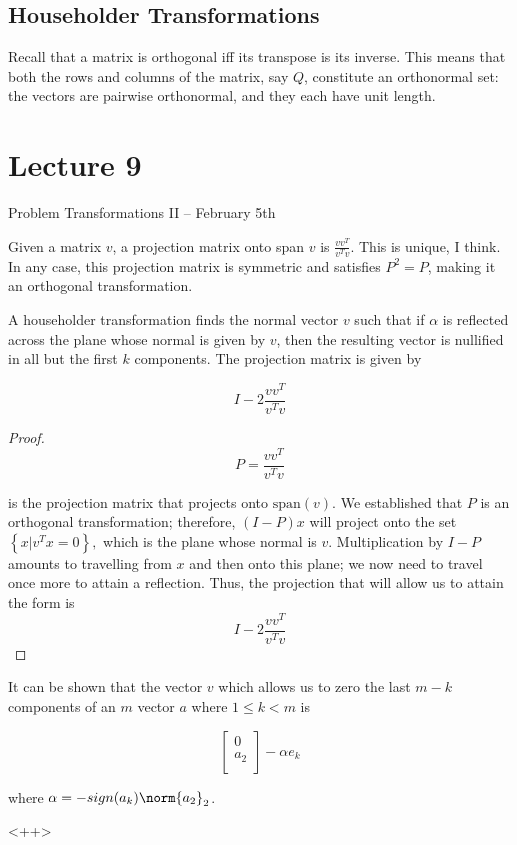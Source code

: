 \documentclass[../main.tex]{subfiles}
\begin{document}
\subsection{Householder Transformations}


\begin{remark}
    Recall that a matrix is orthogonal iff its transpose is its inverse.
    This means that both the rows and columns of the matrix, say $Q$, constitute an orthonormal set: the vectors are pairwise orthonormal, and they each have unit length.
\end{remark}
\begin{definition}
    
\end{definition}

\section{Lecture 9}{Problem Transformations II -- February 5th}
\begin{definition}
    Given a matrix $v$, a projection matrix onto span $v$ is $\frac{vv^T}{v^Tv}.$ This is unique, I think. In any case, this projection matrix is symmetric and satisfies $P^2 = P$, making it an orthogonal transformation.
\end{definition}

\begin{proposition}
    A householder transformation finds the normal vector $v$ such that if $\alpha$ is reflected across the plane whose normal is given by $v$, then the resulting vector is nullified in all but the first $k$ components. The projection matrix is given by 

    \[
        I - 2 \frac{v v^T}{v^Tv}
    \]
\end{proposition}
\begin{proof}
    \[
        P = \frac{vv^T}{v^Tv}
    \]

    is the projection matrix that projects onto $\text{span}(v)$. We established that $P$ is an orthogonal transformation; therefore, $(I - P)x$ will project onto the set $\left\{ x | v^Tx = 0 \right\},$ which is the plane whose normal is $v$. Multiplication by $I - P$ amounts to travelling from $x$ and then onto this plane; we now need to travel once more to attain a reflection. Thus, the projection that will allow us to attain the form is
    \[
        I - 2 \frac{v v^T}{v^Tv}
    \]
\end{proof}

\begin{proposition}
    It can be shown that the vector $v$ which allows us to zero the last $m-k$ components of an $m$ vector $a$ where $1 \leq k < m$ is

    \[
        \begin{bmatrix}
            0 \\
            a_2 \\
        \end{bmatrix} - \alpha e_k
    \]

    where $\alpha = -sign(a_k)\norm{a_2}_2$.
\end{proposition}<++>
\end{document}
